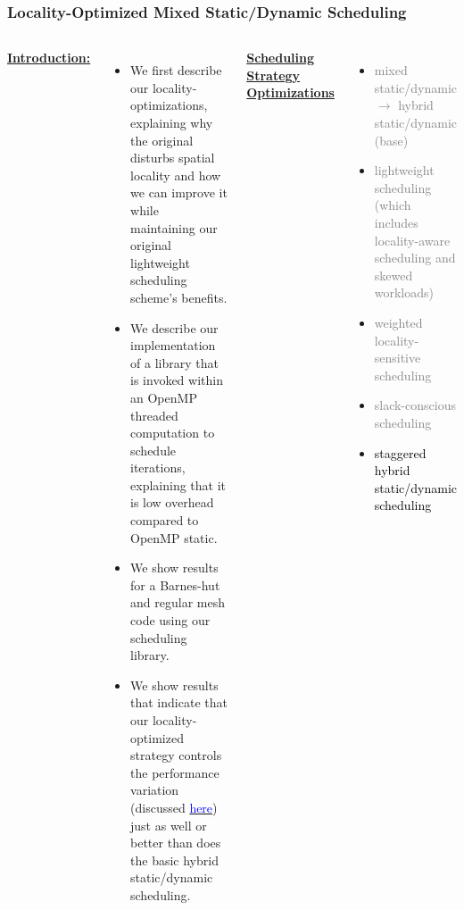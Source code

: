 \begin{frame}[label=locOptHybrid]
\frametitle{Locality-Optimized Mixed Static/Dynamic Scheduling}
\begin{columns}[T]
{\small \underline{\textbf{Introduction:}}} \\
\begin{itemize}
  \tiny \item \tiny We first describe our locality-optimizations,
  explaining why the original disturbs spatial locality and how we can
  improve it while maintaining our original lightweight scheduling
  scheme's benefits. 
\item \tiny We describe our implementation of a library that is
  invoked within an OpenMP threaded computation to schedule
  iterations, explaining that it is low overhead compared to OpenMP
  static.  
\item \tiny We show results for a Barnes-hut and regular mesh code 
  using our scheduling library.
\item \tiny We show results that indicate that our locality-optimized 
strategy controls the performance variation (discussed
\hyperlink{perfVar}{\textcolor{blue}{here}}) just as well or better than
does the basic hybrid static/dynamic scheduling. 
\end{itemize}
\vrule{}
       {\tiny  \underline{\textbf{Scheduling Strategy Optimizations}}}\\
       \begin{itemize}
         \tiny \item \tiny \textcolor{gray}{ mixed static/dynamic $\rightarrow$ hybrid static/dynamic  (base)}
       \item \tiny  \textcolor{gray}{lightweight scheduling (which includes locality-aware scheduling and skewed workloads)}
       \item \tiny \textcolor{gray} {weighted locality-sensitive scheduling}
       \item \tiny \textcolor{gray} {slack-conscious scheduling}
       \item \tiny \textcolor{black} {staggered hybrid static/dynamic scheduling}

\end{itemize}
\end{columns}
\end{frame}
